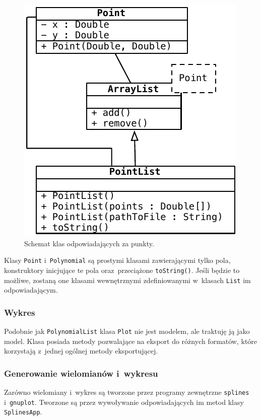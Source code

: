 \documentclass[10pt,a4paper]{article}
\newcommand{\f}[1]{\texttt{#1}}
\begin{document}
\begin{figure}[ht]
  \centering
  \includegraphics{figury/punkty-szczegolowo}
  \caption{Schemat klas odpowiadających za punkty.}
  \label{fig:punkty-szczegolowo}
\end{figure}

Klasy \f{Point} i~\f{Polynomial} są prostymi klasami zawierającymi tylko pola,
konstruktory inicjujące te pola oraz~przeciążone \f{toString()}. Jeśli będzie
to możliwe, zostaną one klasami wewnętrznymi zdefiniowanymi w~klasach \f{List}
im odpowiadającym.

\subsubsection{Wykres}

Podobnie jak \f{PolynomialList} klasa \f{Plot} nie jest modelem, ale traktuję
ją jako model. Klasa posiada metody pozwalające na eksport do różnych formatów,
które korzystają z~jednej ogólnej metody eksportującej.

\subsubsection{Generowanie wielomianów i~wykresu}

Zarówno wielomiany i~wykres są tworzone przez programy zewnętrzne \f{splines}
i~\f{gnuplot}. Tworzone są przez wywoływanie odpowiadających im metod klasy
\f{SplinesApp}.
\end{document}
